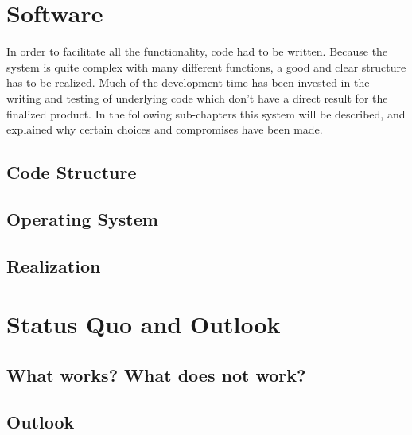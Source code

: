 \documentclass{report}
\begin{document}
\chapter{Software}
\label{chap:software}
In order to facilitate all the functionality, code had to be written. Because the system is quite complex with many different functions, a good and clear structure has to be realized. Much of the development time has been invested in the writing and testing of underlying code which don't have a direct result for the finalized product. In the following sub-chapters this system will be described, and explained why certain choices and compromises have been made.
\section{Code Structure} 
\label{sec:code_structure}

\section{Operating System}
\label{sec:os}

\section{Realization}
\label{sec:realization}


\chapter{Status Quo and Outlook}
\label{chap:status}
\section{What works? What does not work?}
\label{sec:what}

\section{Outlook}
\label{sec:outlook}

\printbibliography[heading=bibintoc]
\end{document}
